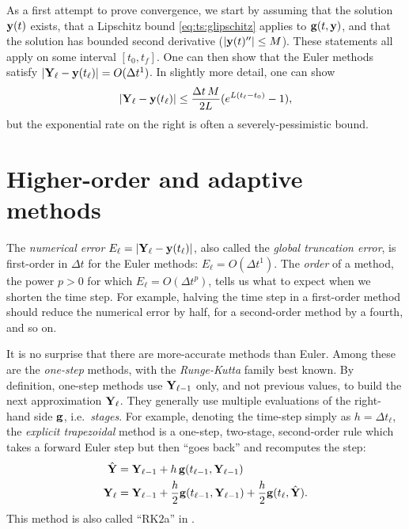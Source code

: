 As a first attempt to prove convergence, we start by assuming that the solution $\mathbf{y}(t)$ exists, that a Lipschitz bound \eqref{eq:ts:glipschitz} applies to $\mathbf{g}(t,\mathbf{y})$, and that the solution has bounded second derivative ($|\mathbf{y}(t)''|\le M$).  These statements all apply on some interval $[t_0,t_f]$.  One can then show that the Euler methods satisfy $|\mathbf{Y}_\ell-\mathbf{y}(t_\ell)| = O(\Delta t^1)$.  In slightly more detail, one can show \citep{AscherPetzold1998}
\begin{equation}
|\mathbf{Y}_\ell-\mathbf{y}(t_\ell)| \le \frac{\Delta t\,M}{2L} (e^{L(t_\ell-t_0)}-1),  \label{eq:ts:eulerbound}
\end{equation}
but the exponential rate on the right is often a severely-pessimistic bound.


\section{Higher-order and adaptive methods}

The \emph{numerical error} $E_\ell = |\mathbf{Y}_\ell-\mathbf{y}(t_\ell)|$, also called the \emph{global truncation error}, is first-order in $\Delta t$ for the Euler methods: $E_\ell = O(\Delta t^1)$.  The \emph{order} of a method, the power $p>0$ for which $E_\ell = O(\Delta t^p)$, tells us what to expect when we shorten the time step.  For example, halving the time step in a first-order method should reduce the numerical error by half, for a second-order method by a fourth, and so on.

\newcommand{\RKtwoa}{RK$2$a\xspace}
\newcommand{\RKthreebs}{RK$3$bs\xspace}
\newcommand{\RKfour}{RK$4$\xspace}

It is no surprise that there are more-accurate methods than Euler.  Among these are the \emph{one-step} methods, with the \emph{Runge-Kutta} family best known.  By definition, one-step methods use $\mathbf{Y}_{\ell-1}$ only, and not previous values, to build the next approximation $\mathbf{Y}_\ell$.  They generally use multiple evaluations of the right-hand side $\mathbf{g}$, i.e.~\emph{stages}.  For example, denoting the time-step simply as $h=\Delta t_\ell$, the \emph{explicit trapezoidal} method \citep{AscherPetzold1998} is a one-step, two-stage, second-order rule which takes a forward Euler step but then ``goes back'' and recomputes the step:
\begin{align}
\hat{\mathbf{Y}} &= \mathbf{Y}_{\ell-1} + h\, \mathbf{g}(t_{\ell-1},\mathbf{Y}_{\ell-1}) \label{eq:ts:rk2a} \\
\mathbf{Y}_\ell &= \mathbf{Y}_{\ell-1} + \frac{h}{2} \mathbf{g}(t_{\ell-1},\mathbf{Y}_{\ell-1}) + \frac{h}{2} \mathbf{g}(t_\ell,\hat{\mathbf{Y}}). \notag
\end{align}
This method is also called ``\RKtwoa'' in \PETSc.

